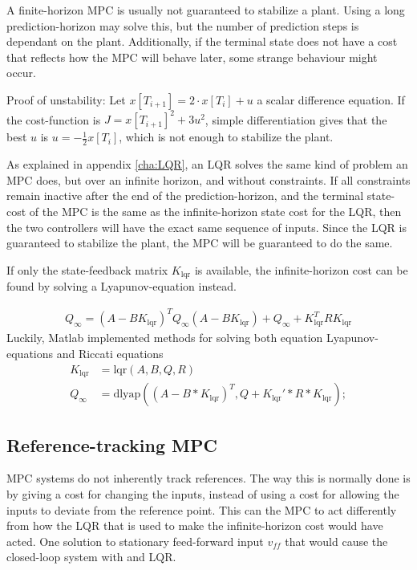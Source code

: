A finite-horizon MPC is usually not guaranteed to stabilize a plant. Using a long prediction-horizon may solve this, but the number of prediction steps is dependant on the plant. Additionally, if the terminal state does not have a cost that reflects how the MPC will behave later, some strange behaviour might occur.  


\noindent 
Proof of unstability: Let $x\left[ T_{i+1} \right] = 2 \cdot x\left[ T_i \right] + u$ a scalar difference equation. If the cost-function is $J =x\left[ T_{i+1} \right]^2 + 3u^2$, simple differentiation gives that the best $u$ is $u = -\frac{1}{2} x\left[ T_i \right]$, which is not enough to stabilize the plant.


\noindent
As explained in appendix \ref{cha:LQR}, an LQR solves the same kind of problem an MPC does, but over an infinite horizon, and without constraints. If all constraints remain inactive  after the end of the prediction-horizon, and the terminal state-cost of the MPC is the same as the infinite-horizon state cost for the LQR, then the two controllers will have the exact same sequence of inputs. Since the LQR is guaranteed to stabilize the plant, the MPC will be guaranteed to do the same. 

\noindent
If only the state-feedback matrix $K_{\text{lqr}}$ is available, the infinite-horizon cost can be found by solving a Lyapunov-equation instead. 

\begin{align}
  \label{eq:Lyapunov_function}
  Q_{\infty} = (A-BK_{\text{lqr}})^T Q_{\infty} (A-BK_{\text{lqr}}) + Q_{\infty} + K_{\text{lqr}}^T R K_{\text{lqr}}
\end{align}
Luckily, Matlab implemented methods for solving both equation Lyapunov-equations and Riccati equations
\begin{align}
  K_{\text{lqr}} &= \text{lqr}\left(A,B,Q,R\right)\\
  Q_{\infty} &= \text{dlyap}((A-B*K_{\text{lqr}})^T, Q+K_{\text{lqr}}'*R*K_{\text{lqr}});
\end{align}

\subsection{Reference-tracking MPC}
MPC systems do not inherently track references. The way this is normally done is by giving a cost for changing the inputs, instead of using a cost for allowing the inputs to deviate from the reference point. This can the MPC to act differently from how the LQR that is used to make the infinite-horizon cost would have acted. One solution to stationary feed-forward input $v_{ff}$ that would cause the closed-loop system with and LQR.

